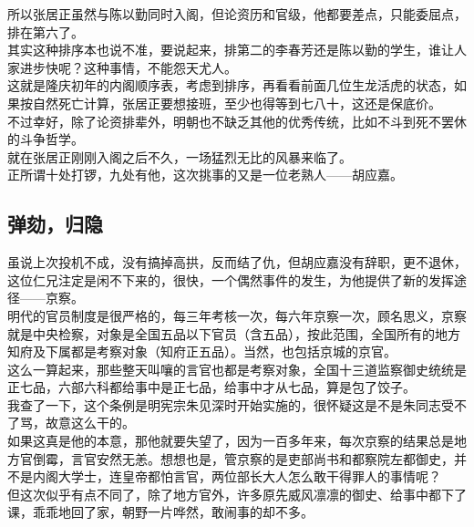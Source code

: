 \begin{multicols}{\theparacolNo}
所以张居正虽然与陈以勤同时入阁，但论资历和官级，他都要差点，只能委屈点，排在第六了。\\

其实这种排序本也说不准，要说起来，排第二的李春芳还是陈以勤的学生，谁让人家进步快呢？这种事情，不能怨天尤人。\\

这就是隆庆初年的内阁顺序表，考虑到排序，再看看前面几位生龙活虎的状态，如果按自然死亡计算，张居正要想接班，至少也得等到七八十，这还是保底价。\\

不过幸好，除了论资排辈外，明朝也不缺乏其他的优秀传统，比如不斗到死不罢休的斗争哲学。\\

就在张居正刚刚入阁之后不久，一场猛烈无比的风暴来临了。\\

正所谓十处打锣，九处有他，这次挑事的又是一位老熟人——胡应嘉。\\

\subsection{弹劾，归隐}
虽说上次投机不成，没有搞掉高拱，反而结了仇，但胡应嘉没有辞职，更不退休，这位仁兄注定是闲不下来的，很快，一个偶然事件的发生，为他提供了新的发挥途径——京察。\\

明代的官员制度是很严格的，每三年考核一次，每六年京察一次，顾名思义，京察就是中央检察，对象是全国五品以下官员（含五品），按此范围，全国所有的地方知府及下属都是考察对象（知府正五品）。当然，也包括京城的京官。\\

这么一算起来，那些整天叫嚷的言官也都是考察对象，全国十三道监察御史统统是正七品，六部六科都给事中是正七品，给事中才从七品，算是包了饺子。\\

我查了一下，这个条例是明宪宗朱见深时开始实施的，很怀疑这是不是朱同志受不了骂，故意这么干的。\\

如果这真是他的本意，那他就要失望了，因为一百多年来，每次京察的结果总是地方官倒霉，言官安然无恙。想想也是，管京察的是吏部尚书和都察院左都御史，并不是内阁大学士，连皇帝都怕言官，两位部长大人怎么敢干得罪人的事情呢？\\

但这次似乎有点不同了，除了地方官外，许多原先威风凛凛的御史、给事中都下了课，乖乖地回了家，朝野一片哗然，敢闹事的却不多。\\


\end{multicols}
